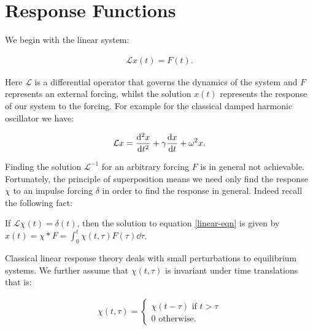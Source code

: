 
\section{Response Functions}

We begin with the linear system: 

\begin{align}
\mathcal{L}x(t) = F(t). \label{linear-eqn}
\end{align}

Here $\mathcal{L}$ is a differential operator that governs the dynamics of the system and $F$ represents an external forcing, whilst the solution $x(t)$ represents the response of our system to the forcing. For example for the classical damped harmonic oscillator we have:

\begin{align*}
\mathcal{L} x = \dv[2]{x}{t} + \gamma \dv{x}{t} + \omega ^2 x.
\end{align*} 

\noindent Finding the solution $\mathcal{L}^{-1}$ for an arbitrary forcing $F$ is in general not achievable. Fortunately, the principle of superposition means we need only find the response $\chi$ to an impulse forcing $\delta$ in order to find the response in general. Indeed recall the following fact:

\begin{thm}
If $\mathcal{L}\chi(t) = \delta(t)$, then the solution to equation \ref{linear-eqn} is given by $x(t) = \chi * F = \int_0^t \chi(t, \tau) F(\tau) \dd \tau$.
\end{thm}


Classical linear response theory deals with small perturbations to equilibrium systems. We further assume that $\chi(t, \tau)$ is invariant under time translations \cite{Tong} that is: 

\begin{align*}
\chi(t, \tau) =  
\begin{cases}
\chi(t - \tau) \text{ if } t > \tau \\
0 \text{ otherwise. } 
\end{cases}
\end{align*}
